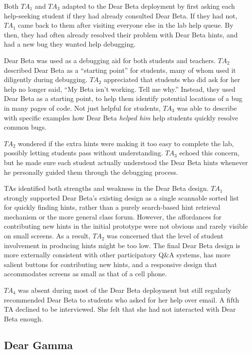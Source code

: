 Both $TA_{1}$ and $TA_{3}$ adapted to the Dear Beta deployment by first asking each help-seeking student if they had already consulted Dear Beta. If they had not, $TA_{1}$ came back to them after visiting everyone else in the lab help queue. By then, they had often already resolved their problem with Dear Beta hints, and had a new bug they wanted help debugging. 

Dear Beta was used as a debugging aid for both students and teachers. $TA_{2}$ described Dear Beta as a ``starting point'' for students, many of whom used it diligently during debugging. $TA_{2}$ appreciated that students who did ask for her help no longer said, ``My Beta isn't working. Tell me why.'' Instead, they used Dear Beta as a starting point, to help them identify potential locations of a bug in many pages of code. Not just helpful for students, $TA_{3}$ was able to describe with specific examples how Dear Beta \textit{helped him} help students quickly resolve common bugs.

$TA_{2}$ wondered if the extra hints were making it too easy to complete the lab, possibly letting students pass without understanding. $TA_{3}$ echoed this concern, but he made sure each student actually understood the Dear Beta hints whenever he personally guided them through the debugging process.

TAs identified both strengths and weakness in the Dear Beta design. $TA_{1}$ strongly supported Dear Beta's existing design as a single scannable sorted list for quickly finding hints, rather than a purely search-based hint retrieval mechanism or the more general class forum. However, the affordances for contributing new hints in the initial prototype were not obvious and rarely visible on small screens. As a result, $TA_{2}$ was concerned that the level of student involvement in producing hints might be too low. The final Dear Beta design is more externally consistent with other participatory Q\&A systems, has more salient buttons for contributing new hints, and a responsive design that accommodates screens as small as that of a cell phone. 

$TA_{4}$ was absent during most of the Dear Beta deployment but still regularly recommended Dear Beta to students who asked for her help over email. A fifth TA declined to be interviewed. She felt that she had not interacted with Dear Beta enough.

\subsection{Dear Gamma}

